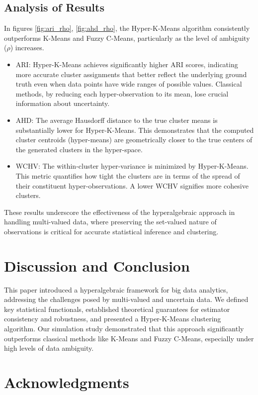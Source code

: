 \documentclass[twoside]{article}
\begin{document}
\subsection{Analysis of Results}
In figures \ref{fig:ari_rho}, \ref{fig:ahd_rho}, the Hyper-K-Means algorithm consistently outperforms K-Means and Fuzzy C-Means, particularly as the level of ambiguity ($\rho$) increases.
\begin{itemize}
    \item ARI: Hyper-K-Means achieves significantly higher ARI scores, indicating more accurate cluster assignments that better reflect the underlying ground truth even when data points have wide ranges of possible values. Classical methods, by reducing each hyper-observation to its mean, lose crucial information about uncertainty.
    \item AHD: The average Hausdorff distance to the true cluster means is substantially lower for Hyper-K-Means. This demonstrates that the computed cluster centroids (hyper-means) are geometrically closer to the true centers of the generated clusters in the hyper-space.
    \item WCHV: The within-cluster hyper-variance is minimized by Hyper-K-Means. This metric quantifies how tight the clusters are in terms of the spread of their constituent hyper-observations. A lower WCHV signifies more cohesive clusters.
\end{itemize}
These results underscore the effectiveness of the hyperalgebraic approach in handling multi-valued data, where preserving the set-valued nature of observations is critical for accurate statistical inference and clustering.


\section*{Discussion and Conclusion}   

This paper introduced a hyperalgebraic framework for big data analytics, addressing the challenges posed by multi-valued and uncertain data. We defined key statistical functionals, established theoretical guarantees for estimator consistency and robustness, and presented a Hyper-K-Means clustering algorithm. Our simulation study demonstrated that this approach significantly outperforms classical methods like K-Means and Fuzzy C-Means, especially under high levels of data ambiguity.

\section*{Acknowledgments} 
\end{document}
